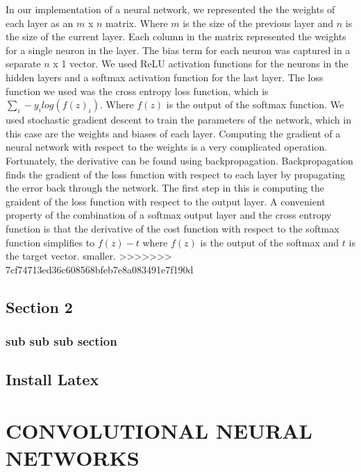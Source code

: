 \documentclass[10pt,twoside]{article}
\begin{document}
In our implementation of a neural network, we represented the the weights of each layer as an $m$ x $n$ matrix. Where $m$ is the size of the previous layer and $n$ is the size of the current layer. Each column in the matrix represented the weights for a single neuron in the layer. The bias term for each neuron was captured in a separate $n$ x 1 vector. We used ReLU activation functions for the neurons in the hidden layers and a softmax activation function for the last layer. The loss function we used was the cross entropy loss function, which is $\sum _i -y_i log(f(z)_i) $. Where $f(z)$ is the output of the softmax function. We used stochastic gradient descent to train the parameters of the network, which in this case are the weights and biases of each layer. Computing the gradient of a neural network with respect to the weights is a very complicated operation. Fortunately, the derivative can be found using backpropagation. Backpropagation finds the gradient of the loss function with respect to each layer by propagating the error back through the network. The first step in this is computing the graident of the loss function with respect to the output layer. A convenient property of the combination of a softmax output layer and the cross entropy function is that the derivative of the cost function with respect to the softmax function simplifies to $f(z)-t$ where $f(z)$ is the output of the softmax and $t$ is the target vector. 
\noindent smaller.
>>>>>>> 7cf74713ed36c608568bfeb7e8a083491e7f190d

\subsection{Section 2}


\subsubsection{sub sub sub section}


\subsection{Install Latex}


\section{\uppercase{Convolutional Neural Networks}}
\end{document}
